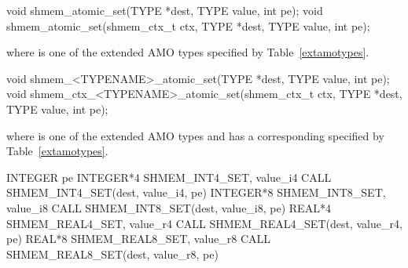 
\begin{apidefinition}

\begin{C11synopsis}
void shmem_atomic_set(TYPE *dest, TYPE value, int pe);
void shmem_atomic_set(shmem_ctx_t ctx, TYPE *dest, TYPE value, int pe);
\end{C11synopsis}
where \TYPE{} is one of the extended \ac{AMO} types specified by
Table~\ref{extamotypes}.

\begin{Csynopsis}
void shmem_<TYPENAME>_atomic_set(TYPE *dest, TYPE value, int pe);
void shmem_ctx_<TYPENAME>_atomic_set(shmem_ctx_t ctx, TYPE *dest, TYPE value, int pe);
\end{Csynopsis}
where \TYPE{} is one of the extended \ac{AMO} types and has a corresponding
\TYPENAME{} specified by Table~\ref{extamotypes}.

\begin{Fsynopsis}
INTEGER pe
INTEGER*4 SHMEM_INT4_SET, value_i4
CALL SHMEM_INT4_SET(dest, value_i4, pe)
INTEGER*8 SHMEM_INT8_SET, value_i8
CALL SHMEM_INT8_SET(dest, value_i8, pe)
REAL*4 SHMEM_REAL4_SET, value_r4
CALL SHMEM_REAL4_SET(dest, value_r4, pe)
REAL*8 SHMEM_REAL8_SET, value_r8
CALL SHMEM_REAL8_SET(dest, value_r8, pe)
\end{Fsynopsis}

\begin{apiarguments}


\end{apiarguments}




\end{apidefinition}
